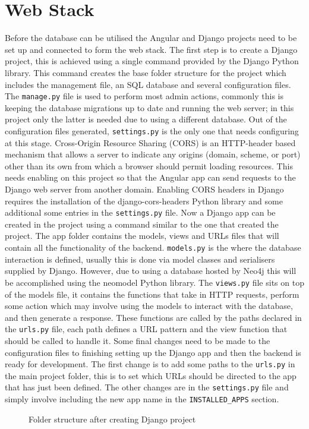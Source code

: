 \section{Web Stack}
Before the database can be utilised the Angular and Django projects need to be set up and connected to form the web stack.
The first step is to create a Django project, this is achieved using a single command provided by the Django Python library. 
This command creates the base folder structure for the project which includes the management file, an SQL database and several configuration files.
The \verb|manage.py| file is used to perform most admin actions, commonly this is keeping the database migrations up to date and running the web server; 
in this project only the latter is needed due to using a different database. Out of the configuration files generated, \verb|settings.py| 
is the only one that needs configuring at this stage. Cross-Origin Resource Sharing (CORS) is an HTTP-header based mechanism that allows a server to 
indicate any origins (domain, scheme, or port) other than its own from which a browser should permit loading resources\cite{CrossOriginResourceSharing2023}.
This needs enabling on this project so that the Angular app can send requests to the Django web server from another domain. Enabling CORS headers in Django 
requires the installation of the django-cors-headers Python library and some additional some entries in the \verb|settings.py| file. 
Now a Django app can be created in the project using a command similar to the one that created the project. The app folder contains the models, views and URLs files 
that will contain all the functionality of the backend. \verb|models.py| is the where the database interaction is defined, usually this is done via model classes 
and serialisers supplied by Django. However, due to using a database hosted by Neo4j this will be accomplished using the neomodel Python library. 
The \verb|views.py| file sits on top of the models file, it contains the functions that take in HTTP requests, perform some action which may involve using the models 
to interact with the database, and then generate a response. These functions are called by the paths declared in the \verb|urls.py| file, each path defines a URL pattern 
and the view function that should be called to handle it. Some final changes need to be made to the configuration files to finishing setting up the Django app and then the 
backend is ready for development. The first change is to add some paths to the \verb|urls.py| in the main project folder, this is to set which URLs should be directed 
to the app that has just been defined. The other changes are in the \verb|settings.py| file and simply involve including the new app name in the \verb|INSTALLED_APPS| 
section.
\begin{figure}[!htbp]
    \caption{Folder structure after creating Django project}
\end{figure}


